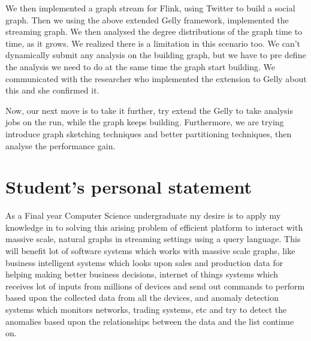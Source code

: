 \documentclass[12pt]{article}
\begin{document}
We then implemented a graph stream for Flink, using Twitter to build a social graph. Then we using the above extended Gelly framework, implemented the streaming graph. We then analysed the degree distributions of the graph time to time, as it grows. We realized there is a limitation in this scenario too. We can't dynamically submit any analysis on the building graph, but we have to pre define the analysis we need to do at the same time the graph start building. We communicated with the researcher who implemented the extension to Gelly about this and she confirmed it. 

Now, our next move is to take it further, try extend the Gelly to take analysis jobs on the run, while the graph keeps building. Furthermore, we are trying introduce graph sketching techniques and better partitioning techniques, then  analyse the performance gain.


\clearpage 
\section{Student’s personal statement} 
As a Final year Computer Science undergraduate my desire is to apply my knowledge in to solving this arising problem of efficient platform to interact with massive scale, natural graphs in streaming settings using a query language. This will benefit lot of software systems which works with massive scale graphs, like business intelligent systems which looks upon sales and production data for helping making better business decisions, internet of things systems which receives lot of inputs from millions of devices and send out commands to perform based upon the collected data from all the devices, and anomaly detection systems which monitors networks, trading systems, etc and try to detect the anomalies based upon the relationships between the data and the list continue on.  
\end{document}
